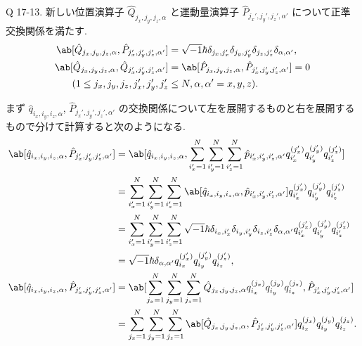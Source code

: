 \documentclass[uplatex,diffipdfmx,a4paper,11pt]{jlreq}
\theoremstyle{definition}
\begin{document}
\begin{itembox}[l]{Q 17-13.}
  新しい位置演算子 $\hat{Q}_{j_x,j_y,j_z,\alpha}$ と運動量演算子 $\hat{P}_{j_x',j_y',j_z',\alpha'}$ について正準交換関係を満たす.
  \begin{align}
    \ab[\hat{Q}_{j_x,j_y,j_z,\alpha}, \hat{P}_{j_x',j_y',j_z',\alpha'}] & = \sqrt{-1}\hbar\delta_{j_x,j_x'}\delta_{j_y,j_y'}\delta_{j_z,j_z'}\delta_{\alpha,\alpha'}, \\
    \ab[\hat{Q}_{j_x,j_y,j_z,\alpha}, \hat{Q}_{j_x',j_y',j_z',\alpha'}] & = \ab[\hat{P}_{j_x,j_y,j_z,\alpha}, \hat{P}_{j_x',j_y',j_z',\alpha'}] = 0                   \\
    (1\leq j_x,j_y,j_z,j_x',j_y',j_z'                                   & \leq N, \alpha,\alpha' = x,y,z).
  \end{align}
\end{itembox}
まず $\hat{q}_{i_x,i_y,i_z,\alpha}$, $\hat{P}_{j_x',j_y',j_z',\alpha'}$ の交換関係について左を展開するものと右を展開するもので分けて計算すると次のようになる.
\begin{align}
  \ab[\hat{q}_{i_x,i_y,i_z,\alpha}, \hat{P}_{j_x',j_y',j_z',\alpha'}] & = \ab[\hat{q}_{i_x,i_y,i_z,\alpha}, \sum_{i_x'=1}^{N}\sum_{i_y'=1}^{N}\sum_{i_z'=1}^{N}\hat{p}_{i_x',i_y',i_z',\alpha'}q_{i_x'}^{(j_x')}q_{i_y'}^{(j_y')}q_{i_z'}^{(j_z')}]                      \\
                                                                      & = \sum_{i_x'=1}^{N}\sum_{i_y'=1}^{N}\sum_{i_z'=1}^{N}\ab[\hat{q}_{i_x,i_y,i_z,\alpha}, \hat{p}_{i_x',i_y',i_z',\alpha'}]q_{i_x'}^{(j_x')}q_{i_y'}^{(j_y')}q_{i_z'}^{(j_z')}                      \\
                                                                      & = \sum_{i_x'=1}^{N}\sum_{i_y'=1}^{N}\sum_{i_z'=1}^{N}\sqrt{-1}\hbar\delta_{i_x,i_x'}\delta_{i_y,i_y'}\delta_{i_z,i_z'}\delta_{\alpha,\alpha'}q_{i_x'}^{(j_x')}q_{i_y'}^{(j_y')}q_{i_z'}^{(j_z')} \\
                                                                      & = \sqrt{-1}\hbar\delta_{\alpha,\alpha'}q_{i_x}^{(j_x')}q_{i_y}^{(j_y')}q_{i_z}^{(j_z')},                                                                                                         \\
  \ab[\hat{q}_{i_x,i_y,i_z,\alpha}, \hat{P}_{j_x',j_y',j_z',\alpha'}] & = \ab[\sum_{j_x=1}^{N}\sum_{j_y=1}^{N}\sum_{j_z=1}^{N}\hat{Q}_{j_x,j_y,j_z,\alpha}q_{i_x}^{(j_x)}q_{i_y}^{(j_y)}q_{i_z}^{(j_z)}, \hat{P}_{j_x',j_y',j_z',\alpha'}]                               \\
                                                                      & = \sum_{j_x=1}^{N}\sum_{j_y=1}^{N}\sum_{j_z=1}^{N}\ab[\hat{Q}_{j_x,j_y,j_z,\alpha}, \hat{P}_{j_x',j_y',j_z',\alpha'}]q_{i_x}^{(j_x)}q_{i_y}^{(j_y)}q_{i_z}^{(j_z)}.
\end{align}
\end{document}
